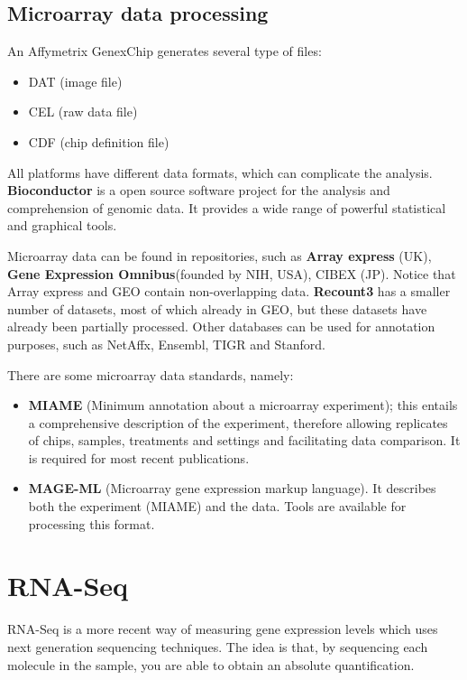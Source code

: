     \subsection{Microarray data processing}
      An Affymetrix GenexChip generates several type of files:
      \begin{itemize}
      	\item DAT (image file)
      	\item CEL (raw data file)
      	\item CDF (chip definition file)
      \end{itemize}
	  All platforms have different data formats, which can complicate the analysis.  
      \textbf{Bioconductor} is a open source software project for the analysis and comprehension of genomic data. It provides a wide range of powerful statistical and graphical tools.

	  Microarray data can be found in repositories, such as \textbf{Array express} (UK), \textbf{Gene Expression Omnibus}(founded by NIH, USA), CIBEX (JP). Notice that Array express and GEO contain non-overlapping data. \textbf{Recount3} has a smaller number of datasets, most of which already in GEO, but these datasets have already been partially processed. Other databases can be used for annotation purposes, such as NetAffx, Ensembl, TIGR and Stanford. 

      There are some microarray data standards, namely:
      \begin{itemize}
      	\item \textbf{MIAME} (Minimum annotation about a microarray experiment); this entails a comprehensive description of the experiment, therefore allowing replicates of chips, samples, treatments and settings and facilitating data comparison. It is required for most recent publications.
      	\item \textbf{MAGE-ML} (Microarray gene expression markup language). It describes both the experiment (MIAME) and the data. Tools are available for processing this format.
      \end{itemize}


  \section{RNA-Seq}

	RNA-Seq is a more recent way of measuring gene expression levels which uses next generation sequencing techniques. The idea is that, by sequencing each molecule in the sample, you are able to obtain an absolute quantification.
    
